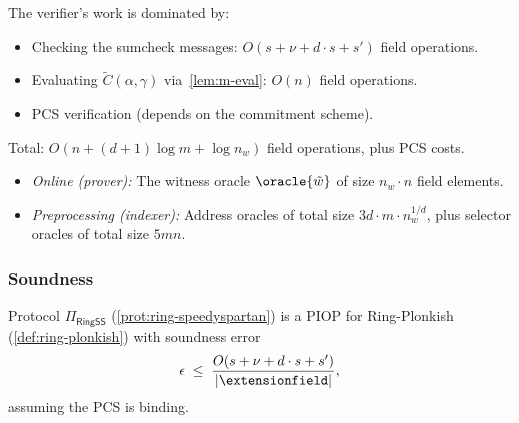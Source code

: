 The verifier's work is dominated by:
\begin{itemize}
    \item Checking the sumcheck messages: $O(s + \nu + d \cdot s + s')$ field operations.
    \item Evaluating $\tilde{C}(\alpha, \gamma)$ via~\cref{lem:m-eval}: $O(n)$ field operations.
    \item PCS verification (depends on the commitment scheme).
\end{itemize}
Total: $O(n + (d+1)\log m + \log n_w)$ field operations, plus PCS costs.

\begin{itemize}
    \item \emph{Online (prover):} The witness oracle $\oracle{\tilde{w}}$ of size $n_w \cdot n$ field elements.
    \item \emph{Preprocessing (indexer):} Address oracles of total size $3d \cdot m \cdot n_w^{1/d}$, plus selector oracles of total size $5mn$.
\end{itemize}


\subsubsection{Soundness}
\label{sec:ring-ss-soundness}

\begin{theorem}
Protocol $\Pi_{\mathsf{RingSS}}$ (\cref{prot:ring-speedyspartan}) is a PIOP for Ring-Plonkish (\cref{def:ring-plonkish}) with soundness error
\[
    \epsilon \;\leq\; \frac{O(s + \nu + d \cdot s + s')}{|\extensionfield|},
\]
assuming the PCS is binding.
\end{theorem}

